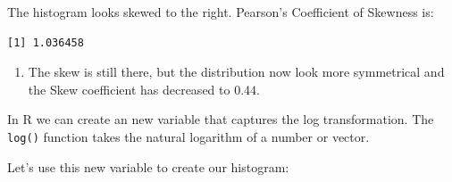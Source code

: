 \documentclass[
  letterpaper,
  DIV=11,
  numbers=noendperiod]{scrreprt}
\newenvironment{Shaded}{\begin{snugshade}}{\end{snugshade}}
\newcommand{\DecValTok}[1]{\textcolor[rgb]{0.68,0.00,0.00}{#1}}
\newcommand{\FunctionTok}[1]{\textcolor[rgb]{0.28,0.35,0.67}{#1}}
\newcommand{\NormalTok}[1]{\textcolor[rgb]{0.00,0.23,0.31}{#1}}
\newcommand{\OtherTok}[1]{\textcolor[rgb]{0.00,0.23,0.31}{#1}}
\newcommand{\SpecialCharTok}[1]{\textcolor[rgb]{0.37,0.37,0.37}{#1}}
\providecommand{\tightlist}{%
  \setlength{\itemsep}{0pt}\setlength{\parskip}{0pt}}\usepackage{longtable,booktabs,array}
\begin{document}
The histogram looks skewed to the right. Pearson's Coefficient of
Skewness is:

\begin{Shaded}
\end{Shaded}

\begin{verbatim}
[1] 1.036458
\end{verbatim}

\begin{enumerate}
\def\labelenumi{\arabic{enumi}.}
\setcounter{enumi}{2}
\tightlist
\item
  The skew is still there, but the distribution now look more
  symmetrical and the Skew coefficient has decreased to \(0.44\).
\end{enumerate}

In R we can create an new variable that captures the log transformation.
The \texttt{log()} function takes the natural logarithm of a number or
vector.

\begin{Shaded}
\end{Shaded}

Let's use this new variable to create our histogram:
\end{document}
